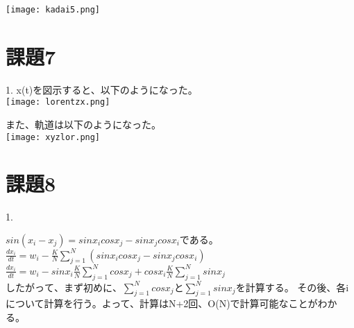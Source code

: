 \documentclass{jarticle}
\begin{document}
\texttt{[image: kadai5.png]}

\section{課題7}

1.
x(t)を図示すると、以下のようになった。\\

\texttt{[image: lorentzx.png]}

また、軌道は以下のようになった。\\

\texttt{[image: xyzlor.png]}

\section{課題8}

1.

$sin(x_i -x_j)= sin x_i cos x_j - sin x_j cos x_iである。$\\
$\frac{dx_i}{dt} = w_i - \frac{K}{N}\sum_{j = 1}^N (sin x_i cos x_j - sin x_j cos x_i)$\\
$\frac{dx_i}{dt} = w_i - sin x_i \frac{K}{N} \sum_{j = 1}^N  cos x_j + cos x_i \frac{K}{N} \sum_{j=1}^N  sin x_j $\\
$したがって、まず初めに、\sum_{j = 1}^N  cos x_jと \sum_{j=1}^N  sin x_j を計算する。$
その後、各iについて計算を行う。よって、計算はN+2回、O(N)で計算可能なことがわかる。
\end{document}
